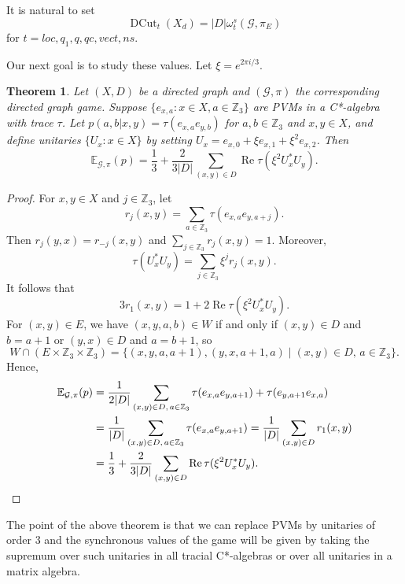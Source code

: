 \documentclass[11pt]{amsart}
\newtheorem{thm}{Theorem}[section]
\theoremstyle{definition}
\DeclareMathOperator{\re}{Re}
\DeclareMathOperator{\DCut}{DCut}
\newcommand{\bb}[1]{\mathbb{#1}}
\newcommand{\cl}[1]{\mathcal{#1}}
\begin{document}
 It is natural to set
 \[\DCut_t(X_d) = |D|\omega^s_t(\cl G,\pi_E)\]
 for $t=loc,q_1,q,qc,vect,ns$.

 Our next goal is to study these values. Let $\xi=e^{2\pi i/3}$.

   \begin{thm}\label{thm:value1} Let $(X, D)$ be a directed graph and $(\cl G,\pi)$ the corresponding directed graph game. Suppose $\{ e_{x,a} : x \in X, a\in \bb Z_3 \}$ are PVMs in a C*-algebra with trace $\tau$. Let $p(a,b|x,y)=\tau(e_{x,a}e_{y,b})$ for $a,b\in \bb Z_3$ and $x,y\in X$, and define unitaries $\{ U_x : x \in X \}$ by setting $U_x= e_{x,0} + \xi e_{x,1} + \xi^2 e_{x,2}$. Then
     \[ \bb E_{\cl G,\pi}(p)=\frac13+\frac2{3|D|}\sum_{(x,y)\in D}\re \tau(\xi^2 U_x^*U_y).\]
   \end{thm}
   \begin{proof}
     For $x,y\in X$ and $j\in \bb Z_3$, let \[r_j(x,y)=\sum_{a\in \bb Z_3} \tau(e_{x,a}e_{y,a+j}).\] Then $r_j(y,x)=r_{-j}(x,y)$ and $\sum_{j\in \bb Z_3}r_j(x,y)=1$. Moreover,
     \[ \tau(U_x^*U_y)=\sum_{j\in \bb Z_3}\xi^{j}r_j(x,y).\]
     It follows that
     \[ 3r_1(x,y)=1+2\re \tau(\xi^2 U_x^*U_y).\]
     For $(x,y)\in E$, we have $(x,y,a,b)\in W$ if and only if $(x,y)\in D$ and $b=a+1$ or $(y,x)\in D$ and $a=b+1$, so
     \[ W\cap (E\times \bb Z_3\times \bb Z_3)=\{(x,y,a,a+1),(y,x,a+1,a)\mid (x,y)\in D,\,a\in \bb Z_3\}.\]
     Hence,
     \begin{align*}
       \bb E_{\cl G,\pi}(p)
       &=\frac1{2|D|}\sum_{(x,y)\in D,\,a\in \bb Z_3} \tau(e_{x,a}e_{y,a+1})+\tau(e_{y,a+1}e_{x,a})\\
       &=\frac1{|D|}\sum_{(x,y)\in D,\,a\in \bb Z_3} \tau(e_{x,a}e_{y,a+1})=\frac1{|D|}\sum_{(x,y)\in D} r_1(x,y)\\
       &=\frac13+\frac2{3|D|}\sum_{(x,y)\in D}\re \tau(\xi^2 U_x^*U_y).\qedhere
     \end{align*}
   \end{proof}

   The point of the above theorem is that we can replace PVMs by unitaries of order 3 and the synchronous values of the game will be given by taking the supremum over such unitaries in all tracial C*-algebras or over all unitaries in a matrix algebra.
\end{document}
